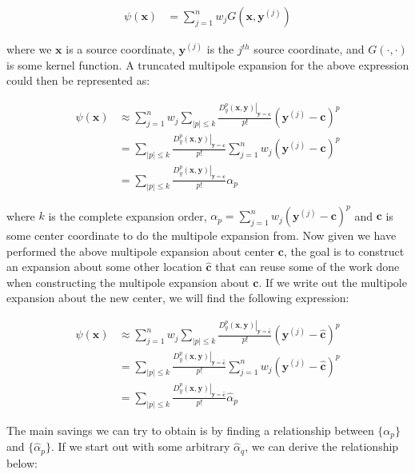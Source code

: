 \documentclass{article}[11pt]
\newcommand{\bvec}[1]{\boldsymbol{#1}}
\begin{document}
   \begin{align*}
    \psi(\bvec{x}) &= \sum_{j=1}^n w_j G(\bvec{x},\bvec{y}^{(j)})
   \end{align*}

   where we $\bvec{x}$ is a source coordinate, $\bvec{y}^{(j)}$ is the $j^{th}$ source coordinate, and $G(\cdot,\cdot)$ is some kernel function. A truncated multipole expansion for the above expression could then be represented as:

   \begin{align*}
    \psi(\bvec{x}) &\approx \sum_{j=1}^n w_j \sum_{|p| \leq k} \frac{ \left. D_{y}^{p}(\bvec{x},\bvec{y}) \right|_{\bvec{y}=\bvec{c}}}{p!} (\bvec{y}^{(j)} - \bvec{c})^{p} \\
            &= \sum_{|p| \leq k} \frac{ \left. D_{y}^{p}(\bvec{x},\bvec{y}) \right|_{\bvec{y}=\bvec{c}}}{p!} \sum_{j=1}^n w_j (\bvec{y}^{(j)} - \bvec{c})^{p} \\
            &= \sum_{|p| \leq k} \frac{ \left. D_{y}^{p}(\bvec{x},\bvec{y}) \right|_{\bvec{y}=\bvec{c}}}{p!} \alpha_p
   \end{align*}

   where $k$ is the complete expansion order, $\alpha_p = \sum_{j=1}^n w_j (\bvec{y}^{(j)} - \bvec{c})^{p}$ and $\bvec{c}$ is some center coordinate to do the multipole expansion from. Now given we have performed the above multipole expansion about center $\bvec{c}$, the goal is to construct an expansion about some other location $\bvec{\hat{c}}$ that can reuse some of the work done when constructing the multipole expansion about $\bvec{c}$. If we write out the multipole expansion about the new center, we will find the following expression:

   \begin{align*}
    \psi(\bvec{x}) &\approx \sum_{j=1}^n w_j \sum_{|p| \leq k} \frac{ \left. D_{y}^{p}(\bvec{x},\bvec{y}) \right|_{\bvec{y}=\bvec{\hat{c}}}}{p!} (\bvec{y}^{(j)} - \bvec{\hat{c}})^{p} \\
            &= \sum_{|p| \leq k} \frac{ \left. D_{y}^{p}(\bvec{x},\bvec{y}) \right|_{\bvec{y}=\bvec{\hat{c}}}}{p!} \sum_{j=1}^n w_j (\bvec{y}^{(j)} - \bvec{\hat{c}})^{p} \\
            &= \sum_{|p| \leq k} \frac{ \left. D_{y}^{p}(\bvec{x},\bvec{y}) \right|_{\bvec{y}=\bvec{\hat{c}}}}{p!} \hat{\alpha}_p
   \end{align*}
   
   The main savings we can try to obtain is by finding a relationship between $\lbrace \alpha_p \rbrace $ and $\lbrace \hat{\alpha}_p \rbrace$. If we start out with some arbitrary $\hat{\alpha}_q$, we can derive the relationship below:
\end{document}
